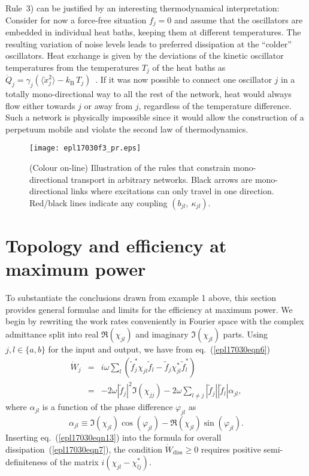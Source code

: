\documentclass[doublecol,final,edchoice]{epl2}
\begin{document}
Rule~3) can be justified by an interesting thermodynamical interpretation: Consider for now a force-free situation $f_j=0$ and assume that the oscillators are embedded in individual heat baths, keeping them at different temperatures. The resulting variation of noise levels leads to preferred dissipation at the ``colder'' oscillators. Heat exchange is given by the deviations of the kinetic oscillator temperatures from the temperatures $T_j$ of the heat baths as $\dot{Q}_j = \gamma_j(\langle \dot{x}_j^2\rangle - k_{\text{B}}\,T_j)$~\cite{epl17030bib17}. If it was now possible to connect one oscillator $j$ in a totally mono-directional way to all the rest of the network, heat would always flow either towards $j$ or away from $j$, regardless of the temperature difference. Such a network is physically impossible since it would allow the construction of a perpetuum mobile and violate the second law of thermodynamics.

\begin{figure}[t]%
\centering\texttt{[image: epl17030f3\_pr.eps]}
\caption{(Colour on-line) Illustration of the rules that constrain mono-directional transport in arbitrary networks. Black arrows are mono-directional links where excitations can only travel in one direction. Red/black lines indicate any coupling $(b_{jl},\ \kappa_{jl})$.}
\label{epl17030fig3}
\vspace*{-12pt}
\end{figure}

\section{Topology and efficiency at maximum power}

To substantiate the conclusions drawn from example 1 above, this section provides general formulae and limits for the efficiency at maximum power. We begin by rewriting the work rates conveniently in Fourier space with the complex admittance split into real $\Re(\chi_{jl})$ and imaginary $\Im(\chi_{jl})$ parts. Using $j,l\in\{a,b\}$ for the input and output, we have from eq.~(\ref{epl17030eqn6})
\begin{eqnarray}%
\dot{W}_j &=&i \omega \sum_l\left(\tilde{f}^{*}_j\chi_{jl}\tilde{f}_l - \tilde{f}^{ }_j\chi^{*}_{jl}\tilde{f}^{*}_l\right)
\label{epl17030eqn13}\\
&=& -2\omega|\tilde{f}_j|^2 \Im(\chi_{jj})-2\omega \sum_{l\neq j} |\tilde{f}_j||\tilde{f}_l| \alpha_{jl},
\label{epl17030eqn14}
\end{eqnarray}
where $\alpha_{jl}$ is a function of the phase difference $\varphi_{jl}$ as
\begin{equation}%
\alpha_{jl} \equiv \Im(\chi_{jl})\cos(\varphi_{jl})-\Re(\chi_{jl})\sin(\varphi_{jl}).
\label{epl17030eqn15}
\end{equation}
Inserting eq.~(\ref{epl17030eqn13}) into the formula for overall dissipation~(\ref{epl17030eqn7}), the condition $\dot{W}_{\text{diss}} \geq 0$
requires positive semi-definiteness of the matrix $i(\chi_{jl}-\chi_{lj}^{*})$.
\end{document}
